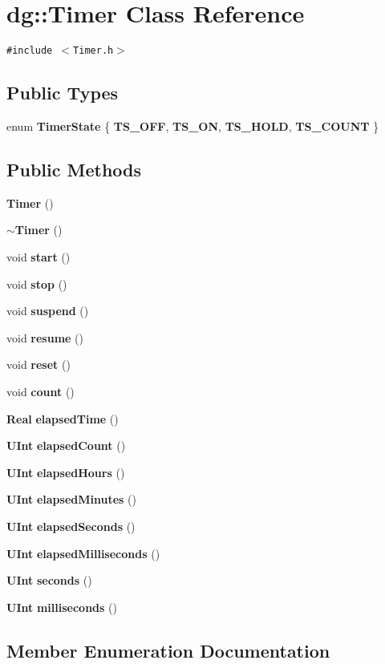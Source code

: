 \section{dg::Timer Class Reference}
\label{classdg_1_1Timer}
{\tt \#include $<$Timer.h$>$}

\subsection*{Public Types}
\begin{CompactItemize}
\item 
enum {\bf Timer\-State} \{ {\bf TS\_\-OFF}, 
{\bf TS\_\-ON}, 
{\bf TS\_\-HOLD}, 
{\bf TS\_\-COUNT}
 \}
\end{CompactItemize}
\subsection*{Public Methods}
\begin{CompactItemize}
\item 
{\bf Timer} ()
\item 
{\bf $\sim$Timer} ()
\item 
void {\bf start} ()
\item 
void {\bf stop} ()
\item 
void {\bf suspend} ()
\item 
void {\bf resume} ()
\item 
void {\bf reset} ()
\item 
void {\bf count} ()
\item 
{\bf Real} {\bf elapsed\-Time} ()
\item 
{\bf UInt} {\bf elapsed\-Count} ()
\item 
{\bf UInt} {\bf elapsed\-Hours} ()
\item 
{\bf UInt} {\bf elapsed\-Minutes} ()
\item 
{\bf UInt} {\bf elapsed\-Seconds} ()
\item 
{\bf UInt} {\bf elapsed\-Milliseconds} ()
\item 
{\bf UInt} {\bf seconds} ()
\item 
{\bf UInt} {\bf milliseconds} ()
\end{CompactItemize}


\subsection{Member Enumeration Documentation}
